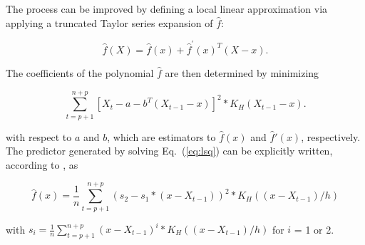 \documentclass[times,10pt,finalversion]{usetex-v1}
\begin{document}
The process can be improved by defining a local linear approximation
via applying a truncated Taylor series expansion of $\hat{f}$:
\begin{small}
{\setlength{\abovedisplayskip}{0pt plus 0pt minus 0pt}
 \setlength{\belowdisplayskip}{0pt plus 0pt minus 0pt}
  \begin{equation}
    \label{eq:localtaylor}
    \hat{f}(X)=\hat{f}(x)+\hat{f}^{'}(x)^{T}(X-x).\nonumber
  \end{equation}
}\end{small}
The coefficients of the polynomial $\hat{f}$ are then determined by minimizing
\begin{small}
{\setlength{\abovedisplayskip}{0pt plus 0pt minus 0pt}
 \setlength{\belowdisplayskip}{0pt plus 0pt minus 0pt}
  \begin{equation}
    \label{eq:lsq}
    \displaystyle\sum_{t=p+1}^{n+p}\left[X_{t}-a-b^{T}(X_{t-1}-x)\right]^{2}*K_{H}(X_{t-1}-x).
  \end{equation}
}\end{small}
with respect to $a$ and $b$, which are estimators to $\hat{f}(x)$ and
$\hat{f}'(x)$, respectively. The predictor generated by
solving Eq.~(\ref{eq:lsq}) can be explicitly written, according to \cite{Box1994}, as
\begin{small}
{\setlength{\abovedisplayskip}{0pt plus 1pt minus 1pt}
 \setlength{\belowdisplayskip}{0pt plus 1pt minus 1pt}
  \begin{equation}
    \label{eq:locallin}
    \hat{f}(x)=\frac{1}{n}\displaystyle\sum_{t=p+1}^{n+p}(s_{2}-s_{1}*(x-X_{t-1}))^{2}* K_{H}((x-X_{t-1})/h)
  \end{equation}
}\end{small}
with
$s_{i}=\frac{1}{n}\displaystyle\sum_{t=p+1}^{n+p}(x-X_{t-1})^{i}*K_{H}((x-X_{t-1})/h)$
for $i$ = 1 or 2.
\end{document}
